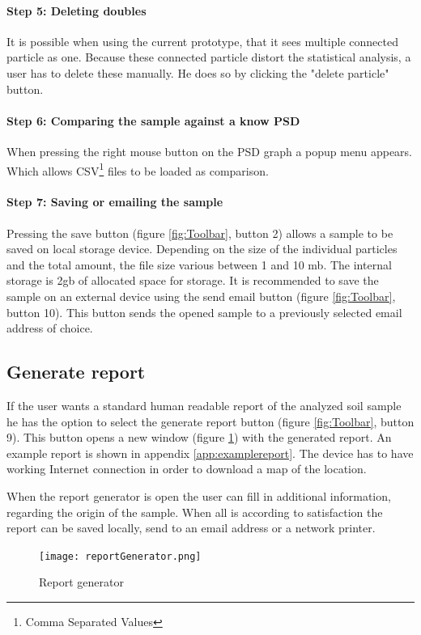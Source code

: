 \documentclass[11pt,fleqn,,a4paper,twoside,openright]{book}
\begin{document}
\paragraph{Step 5: Deleting doubles}
It is possible when using the current prototype, that it sees multiple connected particle as one. Because these connected particle distort the statistical analysis, a user has to delete these manually. He does so by clicking the "delete particle" button.

\paragraph{Step 6: Comparing the sample against a know PSD}
When pressing the right mouse button on the PSD graph a popup menu appears. Which allows CSV\footnote{Comma Separated Values} files to be loaded as comparison.

\paragraph{Step 7: Saving or emailing the sample}
Pressing the save button (figure \ref{fig:Toolbar}, button 2) allows a sample to be saved on local storage device. Depending on the size of the individual particles and the total amount, the file size various between 1 and 10 mb. The internal storage is 2gb of allocated space for storage. It is recommended to save the sample on an external device using the send email button (figure \ref{fig:Toolbar}, button 10). This button sends the opened sample to a previously selected email address of choice.

\subsection{Generate report}
If the user wants a standard human readable report of the analyzed soil sample he has the option to select the generate report button (figure \ref{fig:Toolbar}, button 9). This button opens a new window (figure \ref{fig:Repgen}) with the generated report. An example report is shown in appendix \ref{app:examplereport}. The device has to have working Internet connection in order to download a map of the location.

When the report generator is open the user can fill in additional information, regarding the origin of the sample. When all is according to satisfaction the report can be saved locally, send to an email address or a network printer.
\begin{figure}[h]
	\centering
	\texttt{[image: reportGenerator.png]}
	\caption{Report generator}\label{fig:Repgen}
\end{figure}
\end{document}
